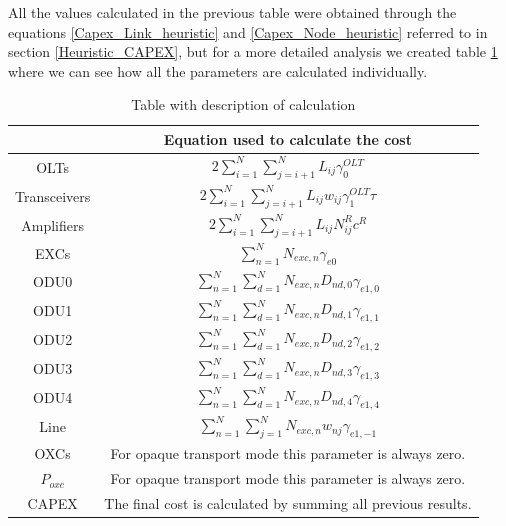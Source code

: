 All the values calculated in the previous table were obtained through the equations \ref{Capex_Link_heuristic} and \ref{Capex_Node_heuristic} referred to in section \ref{Heuristic_CAPEX}, but for a more detailed analysis we created table \ref{formulas_opaque_protec_ref_medium_heuristic} where we can see how all the parameters are calculated individually.\\

\begin{table}[h!]
\centering
\begin{tabular}{|| c | c ||}
 \hline
  & Equation used to calculate the cost \\ \hline
 OLTs & \(\displaystyle 2 \sum_{i=1}^{N}\sum_{j=i+1}^{N} L_{ij} \gamma_0^{OLT} \) \\ \hline
 Transceivers & \(\displaystyle 2 \sum_{i=1}^{N}\sum_{j=i+1}^{N} L_{ij} w_{ij} \gamma_1^{OLT} \tau \) \\ \hline
 Amplifiers & \(\displaystyle 2 \sum_{i=1}^{N}\sum_{j=i+1}^{N} L_{ij} N^R_{ij} c^R \) \\ \hline
 EXCs & \(\displaystyle \sum_{n=1}^N N_{exc,n} \gamma_{e0} \) \\ \hline
 ODU0 & \(\displaystyle \sum_{n=1}^{N} \sum_{d=1}^{N} N_{exc,n} D_{nd,0} \gamma_{e1,0} \) \\ \hline
 ODU1 & \(\displaystyle \sum_{n=1}^{N} \sum_{d=1}^{N} N_{exc,n} D_{nd,1} \gamma_{e1,1} \) \\ \hline
 ODU2 & \(\displaystyle \sum_{n=1}^{N} \sum_{d=1}^{N} N_{exc,n} D_{nd,2} \gamma_{e1,2} \)\\ \hline
 ODU3 & \(\displaystyle \sum_{n=1}^{N} \sum_{d=1}^{N} N_{exc,n} D_{nd,3} \gamma_{e1,3} \) \\ \hline
 ODU4 & \(\displaystyle \sum_{n=1}^{N} \sum_{d=1}^{N} N_{exc,n} D_{nd,4} \gamma_{e1,4} \) \\ \hline
 Line & \(\displaystyle \sum_{n=1}^{N} \sum_{j=1}^{N} N_{exc,n} w_{nj} \gamma_{e1,-1} \) \\ \hline
 OXCs & For opaque transport mode this parameter is always zero. \\ \hline
 $P_{oxc}$ & For opaque transport mode this parameter is always zero. \\ \hline
 CAPEX & The final cost is calculated by summing all previous results. \\
 \hline
 \end{tabular}
\caption{Table with description of calculation}
\label{formulas_opaque_protec_ref_medium_heuristic}
\end{table}

